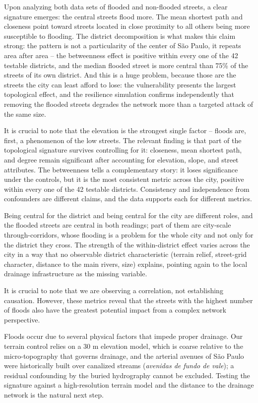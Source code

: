 \documentclass[sn-nature]{sn-jnl}%
\theoremstyle{thmstyleone}%
\theoremstyle{thmstyletwo}%
\theoremstyle{thmstylethree}%
\begin{document}
Upon analyzing both data sets of flooded and non-flooded streets, a clear signature emerges: the central streets flood more. The mean shortest path and closeness point toward streets located in close proximity to all others being more susceptible to flooding. The district decomposition is what makes this claim strong: the pattern is not a particularity of the center of São Paulo, it repeats area after area -- the betweenness effect is positive within every one of the 42 testable districts, and the median flooded street is more central than 75\% of the streets of its own district. And this is a huge problem, because those are the streets the city can least afford to lose: the vulnerability presents the largest topological effect, and the resilience simulation confirms independently that removing the flooded streets degrades the network more than a targeted attack of the same size.

It is crucial to note that the elevation is the strongest single factor -- floods are, first, a phenomenon of the low streets. The relevant finding is that part of the topological signature survives controlling for it: closeness, mean shortest path, and degree remain significant after accounting for elevation, slope, and street attributes. The betweenness tells a complementary story: it loses significance under the controls, but it is the most consistent metric across the city, positive within every one of the 42 testable districts. Consistency and independence from confounders are different claims, and the data supports each for different metrics.

Being central for the district and being central for the city are different roles, and the flooded streets are central in both readings; part of them are city-scale through-corridors, whose flooding is a problem for the whole city and not only for the district they cross. The strength of the within-district effect varies across the city in a way that no observable district characteristic (terrain relief, street-grid character, distance to the main rivers, size) explains, pointing again to the local drainage infrastructure as the missing variable.

It is crucial to note that we are observing a correlation, not establishing causation. However, these metrics reveal that the streets with the highest number of floods also have the greatest potential impact from a complex network perspective.

Floods occur due to several physical factors that impede proper drainage. Our terrain control relies on a 30 m elevation model, which is coarse relative to the micro-topography that governs drainage, and the arterial avenues of São Paulo were historically built over canalized streams (\textit{avenidas de fundo de vale}); a residual confounding by the buried hydrography cannot be excluded. Testing the signature against a high-resolution terrain model and the distance to the drainage network is the natural next step.
\end{document}
